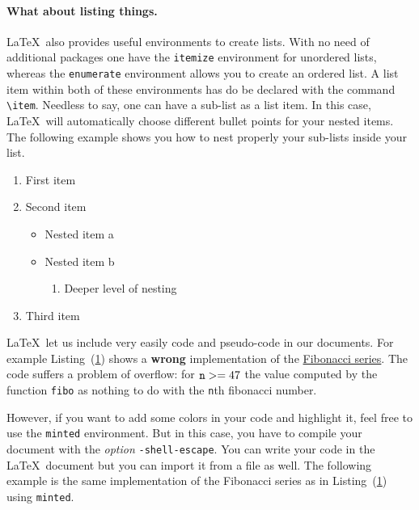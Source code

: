 \documentclass{article}
\newcommand{\latex}{\LaTeX}
\begin{document}
\paragraph{What about listing things.} \latex\ also provides useful environments
to create lists. With no need of additional packages one have the {\tt itemize}
environment for unordered lists, whereas the {\tt enumerate} environment allows
you to create an ordered list. A list item within both of these environments has
do be declared with the command \verb+\item+. Needless to say, one can have a
sub-list as a list item. In this case, \latex\ will automatically choose
different bullet points for your nested items. The following example shows you
how to nest properly your sub-lists inside your list.

\begin{enumerate}
  \item First item
  \item Second item
  \begin{itemize}
    \item Nested item a
    \item Nested item b
    \begin{enumerate}
      \item Deeper level of nesting
    \end{enumerate}
  \end{itemize}
  \item Third item
\end{enumerate}

\latex\  let us include very easily code and pseudo-code in our documents.
For example Listing~(\ref{fibo}) shows a {\bfseries wrong} implementation
of the \href{https://en.wikipedia.org/wiki/Fibonacci\_number}{Fibonacci series}.
The code suffers a problem of overflow: for ${\tt n} >= 47$ the value
computed by the function {\tt fibo} as nothing to do with the {\tt n}th fibonacci number.

\begin{figure} \label{fibo}
\hrulefill
  \hrulefill
\end{figure}

However, if you want to add some colors in your code and highlight it, feel free
to use the {\tt minted} environment. But in this case, you have to compile your
document with the {\em option} {\tt -shell-escape}. You can write your code in
the \latex\ document but you can import it from a file as well. The following
example is the same implementation of the Fibonacci series as in
Listing~(\ref{fibo}) using {\tt minted}.

\inputminted{python}{fibo.py}
\end{document}
